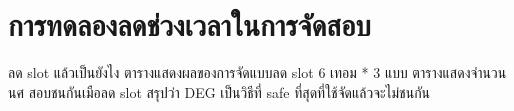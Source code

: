 \begin{table}[]
    \centering
    \caption{แสดงการแจกแจงจำนวนครั้งสำหรับแต่ละระดับความพึงพอใจแบ่งตามภาคการศึกษา}
    \label{tab:eval_result_2}
\end{table}

\section{การทดลองลดช่วงเวลาในการจัดสอบ}
ลด slot แล้วเป็นยังไง
ตารางแสดงผลของการจัดแบบลด slot 6 เทอม * 3 แบบ
ตารางแสดงจำนวน นศ สอบชนกันเมือลด slot
สรุปว่า DEG เป็นวิธีที่ safe ที่สุดที่ใช้จัดแล้วจะไม่ชนกัน

